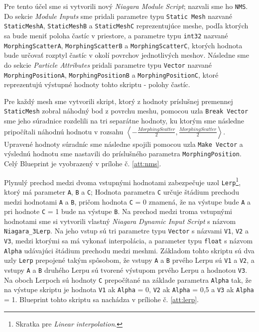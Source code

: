 Pre tento účel sme si vytvorili nový \emph{Niagara Module Script}; nazvali sme ho \texttt{NMS}. Do sekcie \emph{Module Inputs} sme pridali parametre typu \texttt{Static Mesh} nazvané \texttt{StaticMeshA}, \texttt{StaticMeshB} a 
\texttt{StaticMeshC} reprezentujúce meshe, podľa ktorých sa bude meniť poloha častíc v priestore, a parametre typu \texttt{int32} nazvané \texttt{MorphingScatterA}, \texttt{MorphingScatterB} a \texttt{MorphingScatterC},
ktorých hodnota bude určovať rozptyl častíc v okolí povrchov jednotlivých meshov. Následne sme do sekcie \emph{Particle Attributes} pridali parametre typu \texttt{Vector} nazvané \texttt{MorphingPositionA}, 
\texttt{MorphingPositionB} a \texttt{MorphingPositionC}, ktoré reprezentujú výstupné hodnoty tohto skriptu - polohy častíc.

Pre každý mesh sme vytvorili skript, ktorý z hodnoty príslušnej premennej \texttt{StaticMesh} zobral náhodný bod z povrchu meshu, pomocou uzla \texttt{Break Vector} sme jeho súradnice rozdelili na tri 
separátne hodnoty, ku ktorým sme následne pripočítali náhodnú hodnotu v rozsahu \(\left<-\frac{MorphingScatter}{2}, \frac{MorphingScatter}{2}\right>\). Upravené hodnoty súradníc sme následne spojili pomocou uzla 
\texttt{Make Vector} a výslednú hodnotu sme nastavili do príslušného parametra \texttt{MorphingPosition}. Celý Blueprint je vyobrazený v prílohe č. \ref{att:nms}.

Plynulý prechod medzi dvoma vstupnými hodnotami zabezpečuje uzol \texttt{Lerp}\footnote{Skratka pre \emph{Linear interpolation}.}, ktorý má parameter \texttt{A}, \texttt{B} a \texttt{C};
Hodnota parametra \texttt{C} určuje štádium prechodu medzi hodnotami \texttt{A} a \texttt{B}, pričom hodnota \texttt{C} = 0 znamená, že na výstupe bude \texttt{A} a pri hodnote \texttt{C} = 1 bude na výstupe \texttt{B}.
Na prechod medzi troma vstupnými hodnotami sme si vytvorili vlastný \emph{Niagara Dynamic Input Script} s názvom \texttt{Niagara\_3Lerp}. Na jeho vstup sú tri parametre typu \texttt{Vector} s názvami \texttt{V1}, 
\texttt{V2} a \texttt{V3}, medzi ktorými sa má vykonať interpolácia, a parameter typu \texttt{float} s názvom \texttt{Alpha} udávajúci štádium prechodu medzi meshmi. Základom tohto skriptu sú dva uzly \texttt{Lerp} 
prepojené takým spôsobom, že vstupy \texttt{A} a \texttt{B} prvého Lerpu sú \texttt{V1} a \texttt{V2}, a vstupy \texttt{A} a \texttt{B} druhého Lerpu sú tvorené výstupom prvého Lerpu a hodnotou \texttt{V3}.
Na oboch Lerpoch sú hodnoty \texttt{C} prepočítané na základe parametra \texttt{Alpha} tak, že na výstupe skriptu je hodnota \texttt{V1} ak \texttt{Alpha} = 0, \texttt{V2} ak \texttt{Alpha} = 0,5 a \texttt{V3} 
ak \texttt{Alpha} = 1. Blueprint tohto skriptu sa nachádza v príliohe č. \ref{att:lerp}.

